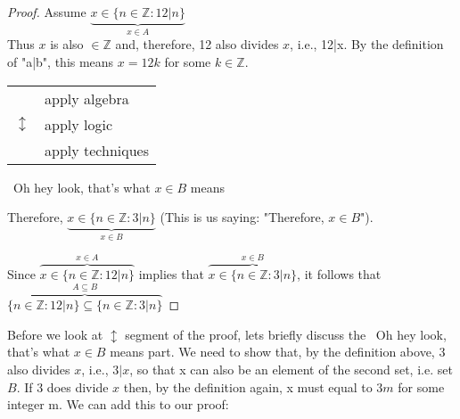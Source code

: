 \documentclass{amsart} %
\theoremstyle{definition} %
\theoremstyle{proposition} %
\theoremstyle{remark} %
\begin{document}
\begin{proof}
      Assume $\underbrace{x \in \{n \in \mathbb{Z}: 12|n \}}_{x \in A}$ \\
      Thus $x$ is also $\in \mathbb{Z}$ and, therefore, 12 also divides $x$, i.e., 12|x. By the definition of "a|b", this means $x=12k$ for some $k \in \mathbb{Z}$.

      \begin{center}
      \begin{tabular}{r l}
            \multirow{3}{*}{\huge $\updownarrow$} & apply algebra \\ %
            & apply logic \\
            & apply techniques \\
      \end{tabular}
      \end{center}

      \begin{center}
      \guillemotleft\ Oh hey look, that's what $x \in B$ means \guillemotright
      \end{center}

      Therefore, $\underbrace{x \in \{n \in \mathbb{Z} : 3|n \}}_{x \in B}$ (This is us saying: "Therefore, $x \in B$").

      Since $\overbrace{x \in\{n \in \mathbb{Z}: 12|n \}}^{x \in A}$ implies that $\overbrace{x \in \{n \in \mathbb{Z} : 3|n \}}^{x \in B}$, it follows that \\ $\overbrace{\{n \in \mathbb{Z}: 12|n \} \subseteq \{n \in \mathbb{Z} : 3|n \}}^{A \subseteq B}$

\end{proof}

Before we look at $\updownarrow$ segment of the proof, lets briefly discuss the \guillemotleft\ Oh hey look, that's what $x \in B$ means \guillemotright part. We need to show that, by the definition above, 3 also divides $x$, i.e., $3|x$, so that x can also be an element of the second set, i.e. set $B$. If 3 does divide $x$ then, by the definition again, x must equal to $3m$ for some integer m. We can add this to our proof:
\end{document}
